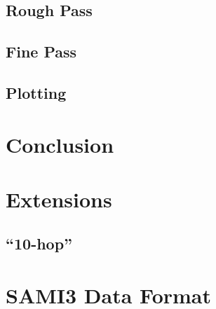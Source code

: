 \documentclass[12pt,letterpaper]{article}
\begin{document}
\subsection{Rough Pass}
\label{sec:design:rough}

\subsection{Fine Pass}
\label{sec:design:fine}

\subsection{Plotting}
\label{sec:design:plotting}

%
%
\section{Conclusion}
\label{sec:conclusion}

%
%
\renewcommand{\bibname}{References}



\begin{appendices}

  \section{Extensions}
  \label{sec:extensions}

  \subsection{``10-hop''}
  \label{sec:extensions:10hop}

  \section{SAMI3 Data Format}
  \label{sec:sami3_df}

\end{appendices}
\end{document}

